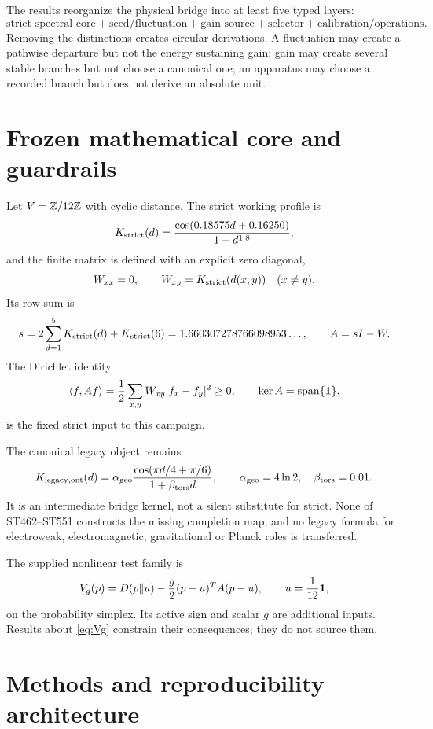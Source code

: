 \documentclass[11pt,a4paper]{article}
\theoremstyle{definition}\newtheorem{definition}[theorem]{Definition}
\theoremstyle{remark}\newtheorem{remark}[theorem]{Remark}
\begin{document}
The results reorganize the physical bridge into at least five typed layers:
\[
\boxed{\text{strict spectral core}+\text{seed/fluctuation}+\text{gain source}+\text{selector}+\text{calibration/operations}.}
\]
Removing the distinctions creates circular derivations. A fluctuation may create a pathwise departure but not the energy sustaining gain; gain may create several stable branches but not choose a canonical one; an apparatus may choose a recorded branch but does not derive an absolute unit.

\section{Frozen mathematical core and guardrails}

Let $V=\mathbb Z/12\mathbb Z$ with cyclic distance. The strict working profile is
\[
K_{\rm strict}(d)=\frac{\cos(0.18575d+0.16250)}{1+d^{1.8}},
\]
and the finite matrix is defined with an explicit zero diagonal,
\[
W_{xx}=0,\qquad W_{xy}=K_{\rm strict}(d(x,y))\quad(x\ne y).
\]
Its row sum is
\[
s=2\sum_{d=1}^{5}K_{\rm strict}(d)+K_{\rm strict}(6)
=1.660307278766098953\ldots,
\qquad A=sI-W.
\]
The Dirichlet identity
\[
\langle f,Af\rangle=\frac12\sum_{x,y}W_{xy}|f_x-f_y|^2\ge0,
\qquad \ker A=\operatorname{span}\{\bm 1\},
\]
is the fixed strict input to this campaign.

The canonical legacy object remains
\[
K_{\rm legacy,ont}(d)=\alpha_{\rm geo}
\frac{\cos(\pi d/4+\pi/6)}{1+\beta_{\rm tors}d},
\qquad \alpha_{\rm geo}=4\ln2,\quad\beta_{\rm tors}=0.01.
\]
It is an intermediate bridge kernel, not a silent substitute for strict. None of ST462--ST551 constructs the missing completion map, and no legacy formula for electroweak, electromagnetic, gravitational or Planck roles is transferred.

The supplied nonlinear test family is
\begin{equation}\label{eq:Vg}
V_g(p)=D(p\|u)-\frac g2(p-u)^TA(p-u),
\qquad u=\frac1{12}\bm 1,
\end{equation}
on the probability simplex. Its active sign and scalar $g$ are additional inputs. Results about \eqref{eq:Vg} constrain their consequences; they do not source them.

\section{Methods and reproducibility architecture}
\end{document}
